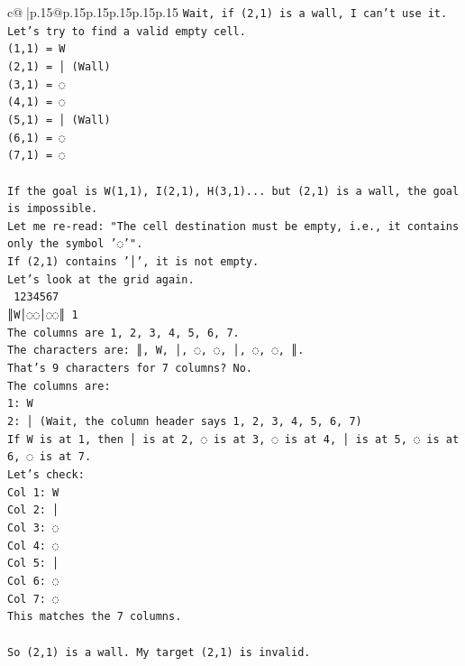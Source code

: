 \documentclass{article}
\begin{document}
{\begin{supertabular}{c@{$\;$}|p{.15\linewidth}@{}p{.15\linewidth}p{.15\linewidth}p{.15\linewidth}p{.15\linewidth}p{.15\linewidth}}
{{{\texttt{Wait, if (2,1) is a wall, I can't use it.} \\
\texttt{Let's try to find a valid empty cell.} \\
\texttt{(1,1) = W} \\
\texttt{(2,1) = │ (Wall)} \\
\texttt{(3,1) = ◌} \\
\texttt{(4,1) = ◌} \\
\texttt{(5,1) = │ (Wall)} \\
\texttt{(6,1) = ◌} \\
\texttt{(7,1) = ◌} \\
\\ 
\texttt{If the goal is W(1,1), I(2,1), H(3,1)... but (2,1) is a wall, the goal is impossible.} \\
\texttt{Let me re{-}read: "The cell destination must be empty, i.e., it contains only the symbol '◌'".} \\
\texttt{If (2,1) contains '│', it is not empty.} \\
\texttt{Let's look at the grid again.} \\
\texttt{ 1234567} \\
\texttt{║W│◌◌│◌◌║ 1} \\
\texttt{The columns are 1, 2, 3, 4, 5, 6, 7.} \\
\texttt{The characters are: ║, W, │, ◌, ◌, │, ◌, ◌, ║.} \\
\texttt{That's 9 characters for 7 columns? No.} \\
\texttt{The columns are:} \\
\texttt{1: W} \\
\texttt{2: │ (Wait, the column header says 1, 2, 3, 4, 5, 6, 7)} \\
\texttt{If W is at 1, then │ is at 2, ◌ is at 3, ◌ is at 4, │ is at 5, ◌ is at 6, ◌ is at 7.} \\
\texttt{Let's check:} \\
\texttt{Col 1: W} \\
\texttt{Col 2: │} \\
\texttt{Col 3: ◌} \\
\texttt{Col 4: ◌} \\
\texttt{Col 5: │} \\
\texttt{Col 6: ◌} \\
\texttt{Col 7: ◌} \\
\texttt{This matches the 7 columns.} \\
\\ 
\texttt{So (2,1) is a wall. My target (2,1) is invalid.} \\
}}}
\end{supertabular}}
\end{document}
